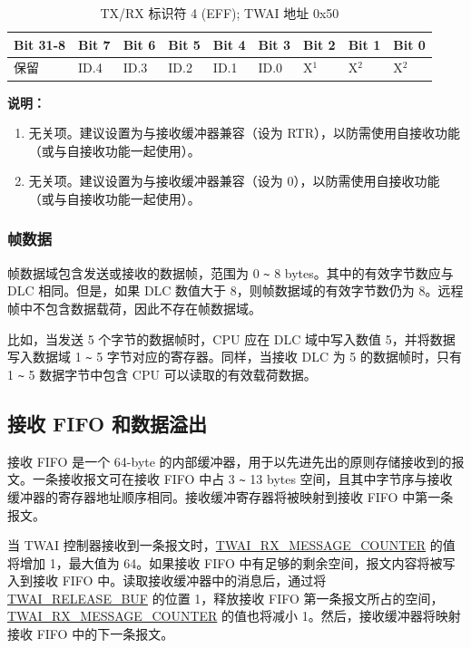 \documentclass[main\_\_CN.tex]{subfiles}
\begin{document}
\begin{longtable}[c]{|p{1.4cm}|p{1.4cm}|p{1.4cm}|p{1.4cm}|p{1.4cm}|p{1.4cm}|p{1.4cm}|p{1.4cm}|p{1.4cm}|}
    \caption{TX/RX 标识符 4 (EFF); TWAI 地址 0x50}
    \label{tab:twai-tx-rx-identifier-4-eff}\\
    \hline
       \rowcolor{lightgray}
    \textbf{Bit 31-8} & \textbf{Bit 7} & \textbf{Bit 6} & \textbf{Bit 5} & \textbf{Bit 4} & \textbf{Bit 3} & \textbf{Bit 2} & \textbf{Bit 1} & \textbf{Bit 0}\\\hline
    保留 & ID.4 & ID.3 & ID.2 & ID.1 & ID.0 & X$^1$ & X$^2$ & X$^2$\\
    \hline
\end{longtable}
\vspace{-1.5em}
{\bfseries 说明：}\\
\begin{enumerate}
    \item 无关项。建议设置为与接收缓冲器兼容（设为 RTR），以防需使用自接收功能（或与自接收功能一起使用）。
    \item 无关项。建议设置为与接收缓冲器兼容（设为 0），以防需使用自接收功能（或与自接收功能一起使用）。
\end{enumerate}

\subsubsection{帧数据}
帧数据域包含发送或接收的数据帧，范围为 0 \verb+~+ 8 bytes。其中的有效字节数应与 DLC 相同。但是，如果 DLC 数值大于 8，则帧数据域的有效字节数仍为 8。远程帧中不包含数据载荷，因此不存在帧数据域。

比如，当发送 5 个字节的数据帧时，CPU 应在 DLC 域中写入数值 5，并将数据写入数据域 1 \verb+~+ 5 字节对应的寄存器。同样，当接收 DLC 为 5 的数据帧时，只有 1 \verb+~+ 5 数据字节中包含 CPU 可以读取的有效载荷数据。

\subsection{接收 FIFO 和数据溢出}

接收 FIFO 是一个 64-byte 的内部缓冲器，用于以先进先出的原则存储接收到的报文。一条接收报文可在接收 FIFO 中占 3 \verb+~+ 13 bytes 空间，且其中字节序与接收缓冲器的寄存器地址顺序相同。接收缓冲寄存器将被映射到接收 FIFO 中第一条报文。

当 TWAI 控制器接收到一条报文时，\hyperref[fielddesc:TWAIRXMESSAGECOUNTER]{TWAI\_RX\_MESSAGE\_COUNTER} 的值将增加 1，最大值为 64。如果接收 FIFO 中有足够的剩余空间，报文内容将被写入到接收 FIFO 中。读取接收缓冲器中的消息后，通过将 \hyperref[fielddesc:TWAIRELEASEBUF]{TWAI\_RELEASE\_BUF} 的位置 1，释放接收 FIFO 第一条报文所占的空间，\hyperref[fielddesc:TWAIRXMESSAGECOUNTER]{TWAI\_RX\_MESSAGE\_COUNTER} 的值也将减小 1。然后，接收缓冲器将映射接收 FIFO 中的下一条报文。
\end{document}

